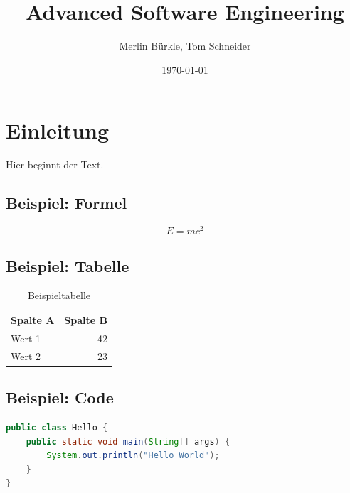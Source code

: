\documentclass[11pt,a4paper]{article}
\title{Advanced Software Engineering}
\author{Merlin Bürkle, Tom Schneider}
\date{\today}
\begin{document}
\maketitle
\tableofcontents
\newpage

\section{Einleitung}
Hier beginnt der Text.

\subsection{Beispiel: Formel}
\begin{equation}
  E = mc^2
\end{equation}

\subsection{Beispiel: Tabelle}
\begin{table}[h]
  \centering
  \begin{tabular}{lr}
    \toprule
    Spalte A & Spalte B \\
    \midrule
    Wert 1 & 42 \\
    Wert 2 & 23 \\
    \bottomrule
  \end{tabular}
  \caption{Beispieltabelle}
\end{table}

\subsection{Beispiel: Code}
\begin{lstlisting}[language=Java]
public class Hello {
    public static void main(String[] args) {
        System.out.println("Hello World");
    }
}
\end{lstlisting}
\end{document}
